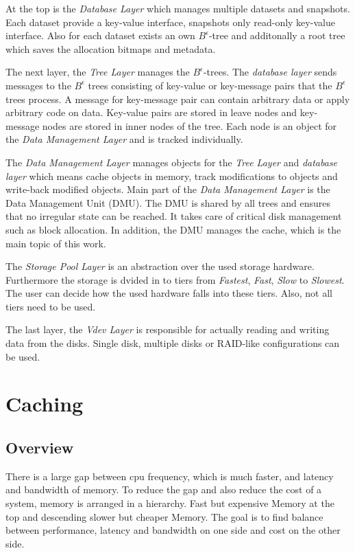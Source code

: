 \documentclass[
	12pt,
	a4paper,
	abstract,
	bibliography=totoc,
	chapterprefix,
	headings=openright,
	numbers=endperiod,
	parskip=half,
	twoside,
]{scrreprt}
\begin{document}
At the top is the \emph{Database Layer} which manages multiple datasets and snapshots. Each dataset provide a key-value interface, snapshots only read-only key-value interface. Also for each dataset exists an own $B^{\epsilon}$-tree and additonally a root tree which saves the allocation bitmaps and metadata.

The next layer, the \emph{Tree Layer} manages the $B^{\epsilon}$-trees.
The \emph{database layer} sends messages to the $B^{\epsilon}$ trees consisting of key-value or key-message pairs that the $B^{\epsilon}$ trees process. A message for key-message pair can contain arbitrary data or apply arbitrary code on data.
Key-value pairs are stored in leave nodes and key-message nodes are stored in inner nodes of the tree.
Each node is an object for the \emph{Data Management Layer} and is tracked individually.

The \emph{Data Management Layer} manages objects for the \emph{Tree Layer} and \emph{database layer} which means cache objects in memory, 
track modifications to objects and write-back modified objects.
Main part of the \emph{Data Management Layer} is the Data Management Unit (DMU).
The DMU is shared by all trees and ensures that no irregular state can be reached.
It takes care of critical disk management such as block allocation.
In addition, the DMU manages the cache, which is the main topic of this work.

The \emph{Storage Pool Layer} is an abstraction over the used storage hardware.
Furthermore the storage is dvided in to tiers from \emph{Fastest}, \emph{Fast}, \emph{Slow} to \emph{Slowest}.
The user can decide how the used hardware falls into these tiers. Also, not all tiers need to be used.

The last layer, the \emph{Vdev Layer} is responsible for actually reading and writing data from the disks.
Single disk, multiple disks or RAID-like configurations can be used.

\section{Caching}
\subsection{Overview}
There is a large gap between cpu frequency, which is much faster, and  latency and bandwidth of memory.
To reduce the gap and also reduce the cost of a system, memory is arranged in a hierarchy.
Fast but expensive Memory at the top and descending slower but cheaper Memory.
The goal is to find balance between performance, latency and bandwidth on one side and cost on the other side.
\end{document}
